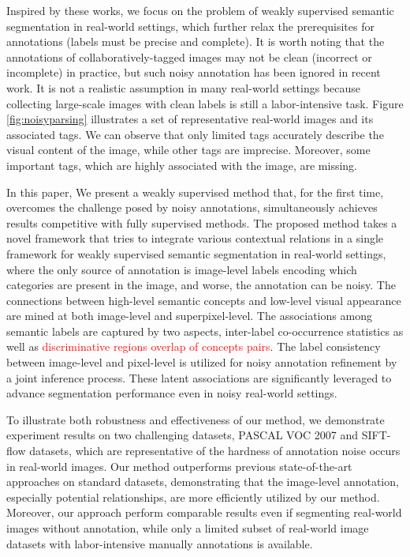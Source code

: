 Inspired by these works, we focus on the problem of weakly supervised semantic segmentation in real-world settings, which further relax the prerequisites for annotations (\eg labels must be precise and complete). It is worth noting that the annotations of collaboratively-tagged images may not be clean (incorrect or incomplete) in practice, but such noisy annotation has been ignored in recent work. It is not a realistic assumption in many real-world settings because collecting large-scale images with clean labels is still a labor-intensive task. Figure \ref{fig:noisyparsing} illustrates a set of representative real-world images and its associated tags. We can observe that only limited tags accurately describe the visual content of the image, while other tags are imprecise. Moreover, some important tags, which are highly associated with the image, are missing.

In this paper, We present a weakly supervised method that, for the first time, overcomes the challenge posed by noisy annotations, simultaneously achieves results competitive with fully supervised methods. The proposed method takes a novel framework that tries to integrate various contextual relations in a single framework for weakly supervised semantic segmentation in real-world settings, where the only source of annotation is image-level labels encoding which categories are present in the image, and worse, the annotation can be noisy. The connections between high-level semantic concepts and low-level visual appearance are mined at both image-level and superpixel-level. The associations among semantic labels are captured by two aspects, inter-label co-occurrence statistics as well as \textcolor{red}{discriminative regions overlap of concepts pairs}. The label consistency between image-level and pixel-level is utilized for noisy annotation refinement by a joint inference process. These latent associations are significantly leveraged to advance segmentation performance even in noisy real-world settings.

To illustrate both robustness and effectiveness of our method, we demonstrate experiment results on two challenging datasets, PASCAL VOC 2007 and SIFT-flow datasets,  which are representative of the hardness of annotation noise occurs in real-world images. Our method outperforms previous state-of-the-art approaches on standard datasets, demonstrating that the image-level annotation, especially potential relationships, are more efficiently utilized by our method. Moreover, our approach perform comparable results even if segmenting real-world images without annotation, while only a limited subset of real-world image datasets with labor-intensive manually annotations is available.


